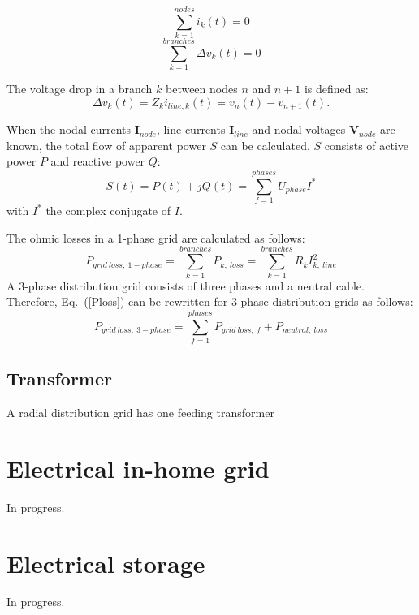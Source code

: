 \begin{equation}
\sum_{k = 1}^{nodes} i_{k}(t) = 0
\label{kirch1}
\end{equation}
\begin{equation}
\sum_{k = 1}^{branches} \Delta v_{k}(t) = 0
\label{kirch2}
\end{equation}

The voltage drop in a branch $k$ between nodes $n$ and $n+1$ is defined as:
\begin{equation}
\Delta v_k(t) = Z_k i_{line,k}(t) = v_n(t) - v_{n+1}(t).
\end{equation}

When the nodal currents $\textbf{I}_{node}$, line currents $\textbf{I}_{line}$ and nodal voltages $\textbf{V}_{node}$ are known, the total flow of apparent power $S$ can be calculated. $S$ consists of active power $P$ and reactive power $Q$:
\begin{equation}
S(t) = P(t) + j Q(t) = \sum_{f = 1}^{phases}U_{phase} I^*
\end{equation}
with $I^*$ the complex conjugate of $I$.

The ohmic losses in a 1-phase grid are calculated as follows:
\begin{equation}
P_{grid~loss,~1-phase} = \sum_{k = 1}^{branches} P_{k,~loss} = \sum_{k = 1}^{branches} R_k I_{k,~line}^{2} 
\label{Ploss}
\end{equation}
A 3-phase distribution grid consists of three phases and a neutral cable. Therefore, Eq.~(\ref{Ploss}) can be rewritten for 3-phase distribution grids as follows:
\begin{equation}
P_{grid~loss,~3-phase} = \sum_{f = 1}^{phases} P_{grid~loss,~f} + P_{neutral,~loss} 
\label{3Ploss}
\end{equation}

\subsection{Transformer}
A radial distribution grid has one feeding transformer

\section{Electrical in-home grid}
In progress.

\section{Electrical storage}
In progress.